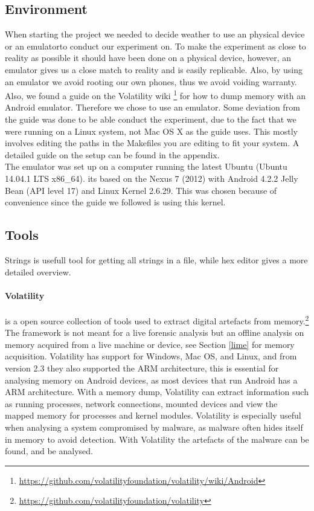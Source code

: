 \subsection{Environment}
When starting the project we needed to decide weather to use an physical device 
or an emulatorto conduct our experiment on. To make the experiment as close to 
reality as possible it should have been done on a physical device, however, an 
emulator gives us a close match to reality and is easily replicable. Also, by 
using an emulator we avoid rooting our own phones, thus we avoid voiding 
warranty. Also, we found a guide on the Volatility wiki
\footnote{\url{https://github.com/volatilityfoundation/volatility/wiki/Android}} 
for how to dump memory with an Android emulator. Therefore we chose to use an 
emulator. Some deviation from the guide was done to be able conduct the 
experiment, due to the fact that we were running on a Linux system, not Mac OS 
X as the guide uses. This mostly involves editing the paths in the Makefiles 
you are editing to fit your system. %
A detailed guide on the setup can be found in the appendix.\\

The emulator was set up on a computer running the latest Ubuntu (Ubuntu 14.04.1 LTS x86\_64).
its based on the Nexus 7 (2012) with Android 4.2.2 Jelly Bean 
(API level 17) and Linux Kernel 2.6.29. This was chosen because of convenience
since the guide we followed is using this kernel.
\subsection{Tools}
Strings is usefull tool for getting all strings in a file, while hex editor gives a more detailed overview.
\paragraph{Volatility} is a open source collection of tools used to extract digital
  artefacts from memory.\footnote{\url{https://github.com/volatilityfoundation/volatility}} 
  The framework is not meant for a live forensic analysis but an offline analysis
  on memory acquired from a live machine or device, see Section \ref{lime} for
  memory acquisition. Volatility has support for Windows, Mac OS, and Linux, and
  from version 2.3 they also supported the ARM architecture, this is essential
  for analysing memory on Android devices, as most devices that run Android has a
  ARM architecture. With a memory dump, Volatility can extract information such as
  running processes, network connections, mounted devices and view the mapped
  memory for processes and kernel modules. Volatility is especially useful when
  analysing a system compromised by malware, as malware often hides itself in
  memory to avoid detection. With Volatility the artefacts of the malware can be
  found, and be analysed. \\
  
